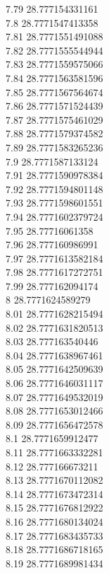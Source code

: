 {7.79	28.777154331161\\
7.8	28.7771547413358\\
7.81	28.7771551491088\\
7.82	28.7771555544944\\
7.83	28.7771559575066\\
7.84	28.7771563581596\\
7.85	28.7771567564674\\
7.86	28.7771571524439\\
7.87	28.7771575461029\\
7.88	28.7771579374582\\
7.89	28.7771583265236\\
7.9	28.7771587133124\\
7.91	28.7771590978384\\
7.92	28.7771594801148\\
7.93	28.7771598601551\\
7.94	28.7771602379724\\
7.95	28.77716061358\\
7.96	28.777160986991\\
7.97	28.7771613582184\\
7.98	28.7771617272751\\
7.99	28.777162094174\\
8	28.7771624589279\\
8.01	28.7771628215494\\
8.02	28.7771631820513\\
8.03	28.777163540446\\
8.04	28.7771638967461\\
8.05	28.7771642509639\\
8.06	28.7771646031117\\
8.07	28.7771649532019\\
8.08	28.7771653012466\\
8.09	28.7771656472578\\
8.1	28.7771659912477\\
8.11	28.7771663332281\\
8.12	28.777166673211\\
8.13	28.7771670112082\\
8.14	28.7771673472314\\
8.15	28.7771676812922\\
8.16	28.7771680134024\\
8.17	28.7771683435733\\
8.18	28.7771686718165\\
8.19	28.7771689981434\\
}
